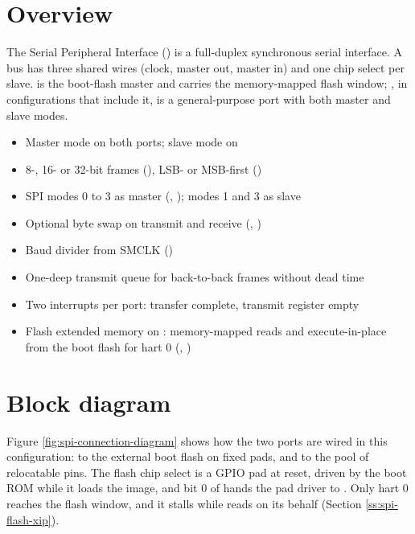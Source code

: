 \section{Overview}

The Serial Peripheral Interface () is a full-duplex synchronous serial interface. A bus has three shared wires (clock, master out, master in) and one chip select per slave.  is the boot-flash master and carries the memory-mapped flash window; , in configurations that include it, is a general-purpose port with both master and slave modes.

\begin{itemize}
	\item Master mode on both ports; slave mode on 
	\item 8-, 16- or 32-bit frames (), LSB- or MSB-first ()
	\item SPI modes 0 to 3 as master (, ); modes 1 and 3 as slave
	\item Optional byte swap on transmit and receive (, )
	\item Baud divider from SMCLK ()
	\item One-deep transmit queue for back-to-back frames without dead time
	\item Two interrupts per port: transfer complete, transmit register empty
	\item Flash extended memory on : memory-mapped reads and execute-in-place from the boot flash for hart 0 (, )
\end{itemize}

\section{Block diagram}

Figure \ref{fig:spi-connection-diagram} shows how the two ports are wired in this configuration:  to the external boot flash on fixed pads, and  to the pool of relocatable pins. The flash chip select is a GPIO pad at reset, driven by the boot ROM while it loads the image, and bit 0 of  hands the pad driver to . Only hart 0 reaches the flash window, and it stalls while  reads on its behalf (Section \ref{ss:spi-flash-xip}).

